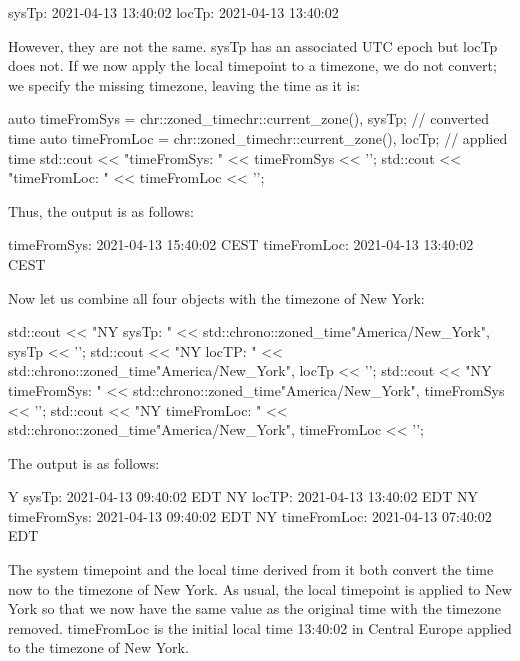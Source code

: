 \begin{shell}
sysTp:     2021-04-13 13:40:02
locTp:     2021-04-13 13:40:02
\end{shell}

However, they are not the same. sysTp has an associated UTC epoch but locTp does not. If we now apply the local timepoint to a timezone, we do not convert; we specify the missing timezone, leaving the time as it is:

\begin{cpp}
auto timeFromSys = chr::zoned_time{chr::current_zone(), sysTp}; // converted time
auto timeFromLoc = chr::zoned_time{chr::current_zone(), locTp}; // applied time
std::cout << "timeFromSys: " << timeFromSys << '\n';
std::cout << "timeFromLoc: " << timeFromLoc << '\n';
\end{cpp}

Thus, the output is as follows:

\begin{shell}
timeFromSys: 2021-04-13 15:40:02 CEST
timeFromLoc: 2021-04-13 13:40:02 CEST
\end{shell}

Now let us combine all four objects with the timezone of New York:

\begin{cpp}
std::cout << "NY sysTp: "
		  << std::chrono::zoned_time{"America/New_York", sysTp} << '\n';
std::cout << "NY locTP: "
		  << std::chrono::zoned_time{"America/New_York", locTp} << '\n';
std::cout << "NY timeFromSys: "
		  << std::chrono::zoned_time{"America/New_York", timeFromSys} << '\n';
std::cout << "NY timeFromLoc: "
		  << std::chrono::zoned_time{"America/New_York", timeFromLoc} << '\n';
\end{cpp}

The output is as follows:

\begin{shell}
Y sysTp:        2021-04-13 09:40:02 EDT
NY locTP:       2021-04-13 13:40:02 EDT
NY timeFromSys: 2021-04-13 09:40:02 EDT
NY timeFromLoc: 2021-04-13 07:40:02 EDT
\end{shell}

The system timepoint and the local time derived from it both convert the time now to the timezone of New York. As usual, the local timepoint is applied to New York so that we now have the same value as the original time with the timezone removed. timeFromLoc is the initial local time 13:40:02 in Central Europe applied to the timezone of New York.


